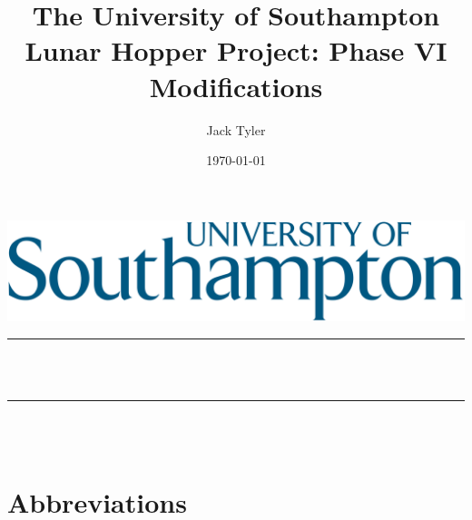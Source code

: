 \documentclass[12pt]{article}
\title{The University of Southampton \\ Lunar Hopper Project: Phase VI Modifications}								%
\author{Jack Tyler}								%
\date{\today}											%
\makeatletter
\let\thetitle\@title
\let\theauthor\@author
\let\thedate\@date
\makeatother
\begin{document}

\begin{titlepage}
	\centering
    \vspace*{0.5 cm}
    \includegraphics[width=\linewidth]{uos_svg}\\[1.0 cm]	%
	\rule{\linewidth}{0.2 mm} \\[0.4 cm]
	{ \huge \bfseries \thetitle}\\
	\rule{\linewidth}{0.2 mm} \\[1.5 cm]
	
	{\large \thedate}\\[2 cm]
 
	\vfill
	
\end{titlepage}

\section*{Abbreviations}
\end{document}

